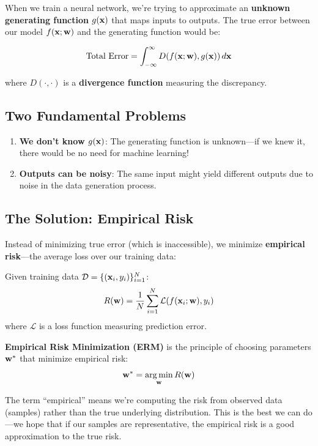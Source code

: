 When we train a neural network, we're trying to approximate an \textbf{unknown generating function} $g(\mathbf{x})$ that maps inputs to outputs. The true error between our model $f(\mathbf{x}; \mathbf{w})$ and the generating function would be:

\[
\text{Total Error} = \int_{-\infty}^{\infty} D(f(\mathbf{x}; \mathbf{w}), g(\mathbf{x})) \, d\mathbf{x}
\]

where $D(\cdot, \cdot)$ is a \textbf{divergence function} measuring the discrepancy.

\subsection{Two Fundamental Problems}

\begin{enumerate}
    \item \textbf{We don't know $g(\mathbf{x})$}: The generating function is unknown---if we knew it, there would be no need for machine learning!
    
    \item \textbf{Outputs can be noisy}: The same input might yield different outputs due to noise in the data generation process.
\end{enumerate}

\subsection{The Solution: Empirical Risk}

Instead of minimizing true error (which is inaccessible), we minimize \textbf{empirical risk}---the average loss over our training data:

\begin{definitionbox}
Given training data $\mathcal{D} = \{(\mathbf{x}_i, y_i)\}_{i=1}^{N}$:
\[
R(\mathbf{w}) = \frac{1}{N} \sum_{i=1}^{N} \mathcal{L}(f(\mathbf{x}_i; \mathbf{w}), y_i)
\]
where $\mathcal{L}$ is a loss function measuring prediction error.
\end{definitionbox}

\textbf{Empirical Risk Minimization (ERM)} is the principle of choosing parameters $\mathbf{w}^*$ that minimize empirical risk:
\[
\mathbf{w}^* = \mathop{\mathrm{arg\,min}}_{\mathbf{w}} R(\mathbf{w})
\]

\begin{bluebox}
The term ``empirical'' means we're computing the risk from observed data (samples) rather than the true underlying distribution. This is the best we can do---we hope that if our samples are representative, the empirical risk is a good approximation to the true risk.
\end{bluebox}

